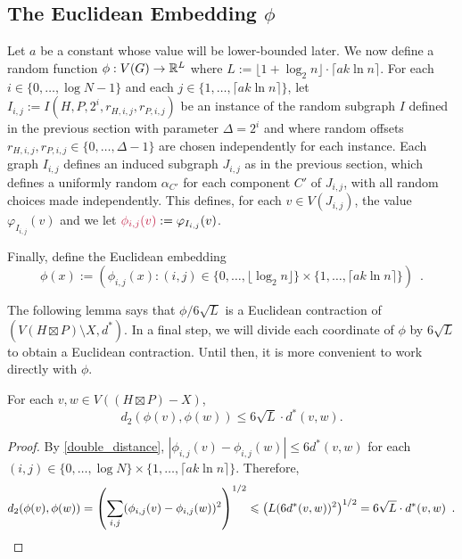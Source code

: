 \documentclass{patmorin}
\makeatletter
\renewcommand{\le}{\leqslant}
\newcommand{\pat}[1]{\textcolor{Blue}{Pat: #1}}
\def\mathcolor#1#{\@mathcolor{#1}}
\def\@mathcolor#1#2#3{%
  \protect\leavevmode
  \begingroup
    \color#1{#2}#3%
  \endgroup
}
\newcommand{\mathdefin}[1]{\mathcolor{brightmaroon}{#1}}
\makeatother
\begin{document}
\subsection{\boldmath The Euclidean Embedding $\phi$}

Let $a$ be a constant whose value will be lower-bounded later.  We now define a random function $\phi:V(G)\to\mathbb{R}^{L}$ where $L:=\lfloor 1+\log_2 n\rfloor\cdot\lceil a k\ln n\rceil$. For each $i\in\{0,\ldots,\log N-1\}$ and each $j\in\{1,\ldots,\lceil a k\ln n\rceil\}$, let $I_{i,j}:=I(H,P,2^i,r_{H,i,j},r_{P,i,j})$ be an instance of the random subgraph $I$ defined in the previous section with parameter $\Delta=2^i$ and where random offsets $r_{H,i,j},r_{P,i,j}\in\{0,\ldots,\Delta-1\}$ are chosen independently for each instance.  Each graph $I_{i,j}$ defines an induced subgraph $J_{i,j}$ as in the previous section, which defines a uniformly random $\alpha_{C'}$ for each component $C'$ of $J_{i,j}$, with all random choices made independently.  This defines, for each $v\in V(J_{i,j})$, the value $\varphi_{I_{i,j}}(v)$ and we let $\mathdefin{\phi_{i,j}(v)}:= \varphi_{I_{i,j}}(v)$.

Finally, define the Euclidean embedding
\[
   \phi(x) := \left(\phi_{i,j}(x):(i,j)\in \{0,\ldots,\lfloor \log_2 n\rfloor\}\times\{1,\ldots,\lceil a k\ln n\rceil\}\right) \enspace .
\]


The following lemma says that $\phi/6\sqrt{L}$ is a Euclidean contraction of $(V(H\boxtimes P)\setminus X,d^*)$.  In a final step, we will divide each coordinate of $\phi$ by $6\sqrt{L}$ to obtain a Euclidean contraction. Until then, it is more convenient to work directly with $\phi$.

\begin{lem}\label{euclidean_contraction}
  For each $v,w\in V((H\boxtimes P)-X)$, $$d_2(\phi(v),\phi(w)) \le 6\sqrt{L}\cdot d^*(v,w).$$
\end{lem}

\begin{proof}
  By \cref{double_distance}, $|\phi_{i,j}(v)-\phi_{i,j}(w)|\le 6d^*(v,w)$ for each $(i,j)\in\{0,\ldots,\log N\}\times\{1,\ldots,\lceil ak\ln n\rceil\}$.  Therefore,
  \[
    d_2(\phi(v),\phi(w)) = \left(\sum_{i,j}(\phi_{i,j}(v)-\phi_{i,j}(w))^2\right)^{1/2}
    \le \left(L (6d^*(v,w))^2\right)^{1/2} = 6\sqrt{L}\cdot d^*(v,w) \enspace . \qedhere
  \]
\end{proof}


\end{document}
